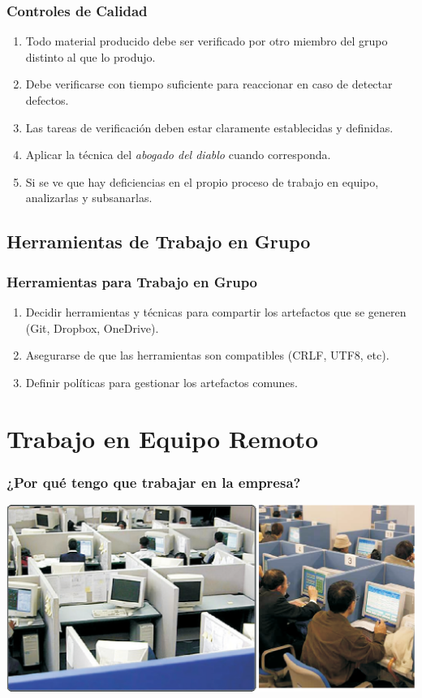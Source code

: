 \documentclass[a4paper,t,xcolor=pst,dvips]{beamer}
\begin{document}
\begin{frame}[c]
	\frametitle{Controles de Calidad}
	\begin{enumerate}[<+->]
		\item Todo material producido debe ser verificado por otro miembro del grupo distinto al que lo produjo.
		\item Debe verificarse con tiempo suficiente para reaccionar en caso de detectar defectos.
		\item Las tareas de verificación deben estar claramente establecidas y definidas.
		\item Aplicar la técnica del \emph{abogado del diablo} cuando corresponda.
		\item Si se ve que hay deficiencias en el propio proceso de trabajo en equipo, analizarlas y subsanarlas.
	\end{enumerate}
\end{frame}

\subsection{Herramientas de Trabajo en Grupo}

\begin{frame}[c]
	\frametitle{Herramientas para Trabajo en Grupo}
	\begin{enumerate}[<+->]
		\item Decidir herramientas y técnicas para compartir los artefactos que se generen (Git, Dropbox, OneDrive).
		\item Asegurarse de que las herramientas son compatibles (CRLF, UTF8, etc).
		\item Definir políticas para gestionar los artefactos comunes.
	\end{enumerate}
\end{frame}

\section{Trabajo en Equipo Remoto}

\begin{frame}[c]
	\frametitle{¿Por qué tengo que trabajar en la empresa?}
	\begin{center}
\includegraphics[width=\linewidth,keepaspectratio=true]{images/realidad.eps}
	\end{center}
\end{frame}
\end{document}
